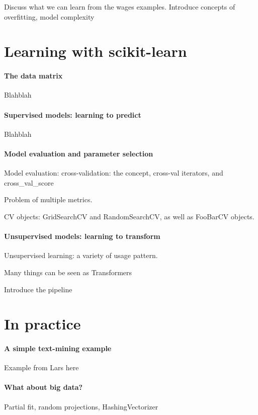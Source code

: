 \documentclass{article}
\begin{document}
Discuss what we can learn from the wages examples. Introduce concepts of
overfitting, model complexity

\section{Learning with scikit-learn}

\paragraph{The data matrix}
%
Blahblah

\paragraph{Supervised models: learning to predict}
%
Blahblah

\paragraph{Model evaluation and parameter selection}
%
Model evaluation:
cross-validation: the concept, cross-val iterators, and cross\_val\_score

Problem of multiple metrics.

CV objects: GridSearchCV and RandomSearchCV, as well as FooBarCV objects.

\paragraph{Unsupervised models: learning to transform}
%
Unsupervised learning: a variety of usage pattern.

Many things can be seen as Transformers

Introduce the pipeline

\section{In practice}

\paragraph{A simple text-mining example}
%
Example from Lars here

\paragraph{What about big data?}
%
Partial fit, random projections, HashingVectorizer
\end{document}
